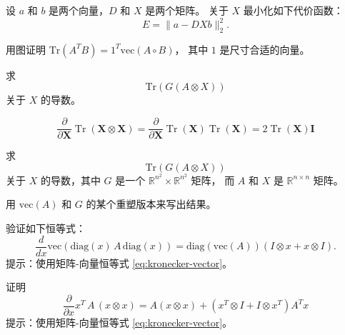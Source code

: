 \begin{exercise}
   设 $a$ 和 $b$ 是两个向量，$D$ 和 $X$ 是两个矩阵。
   关于 $X$ 最小化如下代价函数：
   \[
      E = \|a - D X b\|_2^2.
   \]
\end{exercise}

\begin{exercise}
   用图证明 $\mathrm{Tr}(A^T B) = 1^T \mathrm{vec}(A \circ B)$，
   其中 $1$ 是尺寸合适的向量。
\end{exercise}

\begin{exercise}
   求
   \[
      \mathrm{Tr}(G(A\otimes X))
   \]
   关于 $X$ 的导数。
\end{exercise}

\begin{exercise}
   \[\frac{\partial}{\partial \mathbf{X}} \operatorname{Tr}(\mathbf{X} \otimes \mathbf{X})=\frac{\partial}{\partial \mathbf{X}} \operatorname{Tr}(\mathbf{X}) \operatorname{Tr}(\mathbf{X})=2 \operatorname{Tr}(\mathbf{X}) \mathbf{I}\]
\end{exercise}

\begin{exercise}
   求
   \[
      \mathrm{Tr}(G (A \otimes X))
   \]
   关于 $X$ 的导数，其中 $G$ 是一个 $\mathbb R^{n^2} \times \mathbb R^{n^2}$ 矩阵，
   而 $A$ 和 $X$ 是 $\mathbb R^{n \times n}$ 矩阵。

   用 $\mathrm{vec}(A)$ 和 $G$ 的某个重塑版本来写出结果。
\end{exercise}

\begin{exercise}
   验证如下恒等式：
   \[
      \frac{d}{dx}
      \mathrm{vec}(
         \mathrm{diag}(x)\, A\, \mathrm{diag}(x)
         )
         = \mathrm{diag}(\mathrm{vec}(A)) (I \otimes x + x \otimes I)
         .
   \]
      提示：使用矩阵-向量恒等式 \eqref{eq:kronecker-vector}。
\end{exercise}

\begin{exercise}
      证明
      \[
         \frac{\partial}{\partial x} x^T\, A\, (x \otimes x)
         =
         A(x\otimes x) + (x^T \otimes I + I \otimes x^T) A^T x
      \]
      提示：使用矩阵-向量恒等式 \eqref{eq:kronecker-vector}。
\end{exercise}

